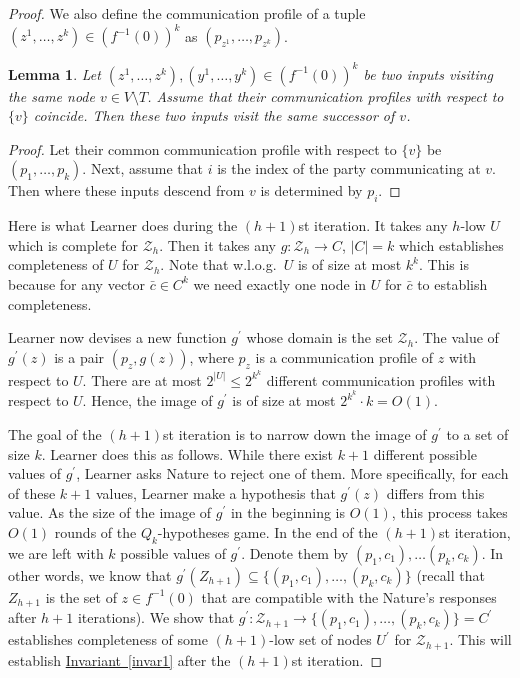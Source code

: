 \documentclass[11pt]{article}
\numberwithin{equation}{section}
\newtheorem{lemma}[theorem]{Lemma}
\theoremstyle{definition}
\theoremstyle{plain}
\newcommand{\expref}[2]{\hyperref[#2]{#1~\ref{#2}}}
\begin{document}
\begin{proof}
We also define the communication profile of a tuple $(z^1, \ldots, z^k) \in (f^{-1}(0))^k$ as $(p_{z^1}, \ldots, p_{z^k})$.

\begin{lemma}
\label{communication_profile_lemma}
Let $(z^1, \ldots, z^k), (y^1, \ldots, y^k)  \in (f^{-1}(0))^k$ be two inputs visiting the same node $v\in V\setminus T$. Assume that their communication profiles with respect to $\{v\}$ coincide. Then these two inputs visit the same successor of $v$. 
\end{lemma}
\begin{proof}
Let their common communication profile with respect to $\{v\}$ be $(p_1, \ldots, p_k)$. Next, assume that $i$ is the index of the party communicating at $v$. Then where these inputs descend from $v$ is determined by $p_i$.
\end{proof}
Here is what Learner does during the $(h + 1)$st iteration. It 
%
 takes any $h$-low $U$ which is complete for $\mathcal{Z}_h$. 
 Then it %
 takes any $g\colon \mathcal{Z}_h\to C$, $|C| = k$ which establishes completeness of $U$ for $\mathcal{Z}_h$. 
 Note that w.l.o.g.~$U$ is of size at most $k^k$. This is because for any vector $\bar{c}\in C^k$ we need exactly one node in $U$ for $\bar{c}$ to establish completeness.

 Learner now devises a new function $g^\prime$ whose domain is the set $\mathcal{Z}_h$. The value of $g^\prime(z)$ is a pair $(p_z, g(z))$, where $p_z$ is a communication profile of $z$ with respect to $U$. There are at most $2^{|U|} \le 2^{k^k}$ different communication profiles with respect to $U$. Hence, the image of $g^\prime$ is of size at most $2^{k^k} \cdot k = O(1)$. 

The goal of the $(h+1)$st iteration is to narrow down the image of $g^\prime$ to a set of size $k$. Learner does this as follows. While there exist $k + 1$ different possible values of $g^\prime$, Learner asks Nature to reject one of them. More specifically, for each of these $k + 1$ values, Learner make a hypothesis that $g^\prime(z)$ differs from this value. As the size of the image of $g^\prime$ in the beginning is $O(1)$, this process takes $O(1)$ rounds of the $Q_k$-hypotheses game. In the end of the $(h+1)$st iteration, we are left with $k$ possible values of $g^\prime$. Denote them by $(p_1, c_1), \ldots (p_k, c_k)$. In other words, we know that $g^\prime(Z_{h+1})\subseteq \{(p_1, c_1), \ldots, (p_k, c_k)\}$ (recall that $Z_{h+1}$ is the set of $z\in f^{-1}(0)$ that are compatible with the Nature's responses after $h + 1$ iterations). We show that $g^\prime\colon \mathcal{Z}_{h  + 1}\to\{(p_1, c_1), \ldots, (p_k, c_k)\} = C^\prime$ establishes completeness of some $(h+1)$-low set of nodes $U^\prime$ for $\mathcal{Z}_{h+1}$. This will establish \expref{Invariant}{invar1} after the $(h+1)$st iteration.


\end{proof}
\end{document}
